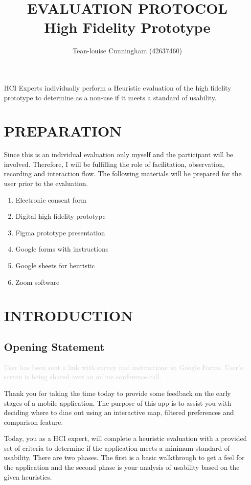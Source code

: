\documentclass[a4 paper, 10pt]{article}
\title{\textbf{EVALUATION PROTOCOL \\ High Fidelity Prototype}}
\author{Tean-louise Cunningham (42637460)}
\date{}
\begin{document}
\maketitle
\begin{center}
HCI Experts individually perform a Heuristic evaluation of the high fidelity prototype to determine as a non-use if it meets a standard of usability.
\end{center}

\section*{PREPARATION}
Since this is an individual evaluation only myself and the participant will be involved. Therefore, I will be fulfilling the role of facilitation, observation, recording and interaction flow. The following materials will be prepared for the user prior to the evaluation.

\begin{enumerate}
    \item Electronic consent form
    \item Digital high fidelity prototype
    \item Figma prototype presentation
    \item Google forms with instructions
    \item Google sheets for heuristic
    \item Zoom software
\end{enumerate}

\section*{INTRODUCTION}

    \subsection*{Opening Statement}

        \textcolor{lightgray}{User has been sent a link with survey and instructions on Google Forms. User’s screen is being shared over an online conference call.}

        \begin{itshape}
            Thank you for taking the time today to provide some feedback on the early stages of a mobile application. The purpose of this app is to assist you with deciding where to dine out using an interactive map, filtered preferences and comparison feature.

            Today, you as a HCI expert, will complete a heuristic evaluation with a provided set of criteria to determine if the application meets a minimum standard of usability. There are two phases. The first is a basic walkthrough to get a feel for the application and the second phase is your analysis of usability based on the given heuristics.
        \end{itshape}
\end{document}
